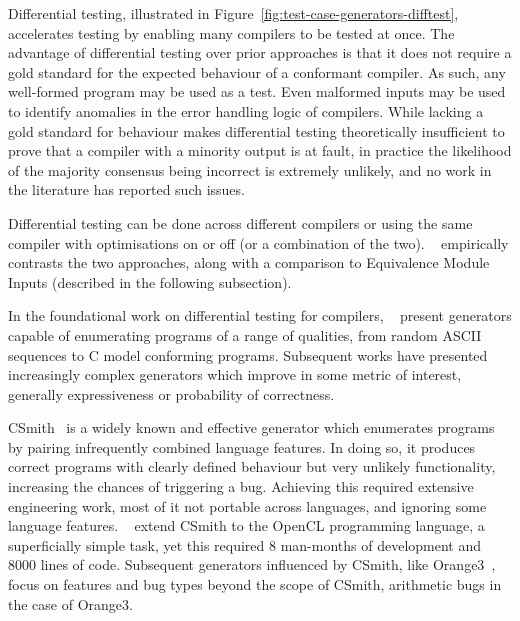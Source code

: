 Differential testing, illustrated in Figure~\ref{fig:test-case-generators-difftest}, accelerates testing by enabling many compilers to be tested at once. The advantage of differential testing over prior approaches is that it does not require a gold standard for the expected behaviour of a conformant compiler. As such, any well-formed program may be used as a test. Even malformed inputs may be used to identify anomalies in the error handling logic of compilers. While lacking a gold standard for behaviour makes differential testing theoretically insufficient to prove that a compiler with a minority output is at fault, in practice the likelihood of the majority consensus being incorrect is extremely unlikely, and no work in the literature has reported such issues.

Differential testing can be done across different compilers or using the same compiler with optimisations on or off (or a combination of the two). \citeauthor{Chen2014a}~\cite{Chen2014a} empirically contrasts the two approaches, along with a comparison to Equivalence Module Inputs (described in the following subsection).

In the foundational work on differential testing for compilers, \citeauthor{McKeeman1998}~\cite{McKeeman1998} present generators capable of enumerating programs of a range of qualities, from random ASCII sequences to C model conforming programs. Subsequent works have presented increasingly complex generators which improve in some metric of interest, generally expressiveness or probability of correctness.

CSmith~\cite{Yang2011} is a widely known and effective generator which enumerates programs by pairing infrequently combined language features. In doing so, it produces correct programs with clearly defined behaviour but very unlikely functionality, increasing the chances of triggering a bug. Achieving this required extensive engineering work, most of it not portable across languages, and ignoring some language features.
\citeauthor{Lidbury2015a}~\cite{Lidbury2015a} extend CSmith to the OpenCL programming language, a superficially simple task, yet this required 8 man-months of development and 8000 lines of code.
Subsequent generators influenced by CSmith, like Orange3~\cite{Nagai2013}, focus on features and bug types beyond the scope of CSmith, arithmetic bugs in the case of Orange3.

